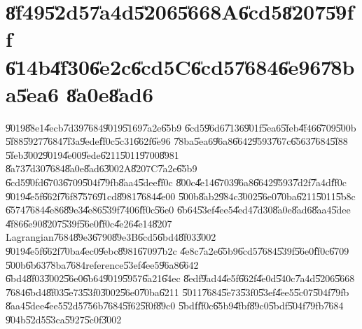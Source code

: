 \documentclass[12pt,a4paper]{article}
\begin{document}
\bigskip

\part{\U{8f49}\U{52d5}\U{7a4d}\U{5206}\U{5668}A\U{6cd5}\U{8207}\U{59ff}%
\U{614b}\U{4f30}\U{6e2c}\U{6cd5}C\U{6cd5}\U{7684}\U{6e96}\U{78ba}\U{5ea6}%
\U{8a0e}\U{8ad6}}

\U{9019}\U{88e1}\U{4ecb}\U{7d39}\U{7684}\U{9019}\U{5169}\U{7a2e}\U{65b9}%
\U{6cd5}\U{96d6}\U{7136}\U{901f}\U{5ea6}\U{5feb}\U{4f46}\U{6709}\U{500b}%
\U{5f88}\U{5927}\U{7684}\U{7f3a}\U{9ede}\U{ff0c}\U{5c31}\U{662f}\U{6e96}%
\U{78ba}\U{5ea6}\U{96a8}\U{6642}\U{9593}\U{767c}\U{6563}\U{7684}\U{5f88}%
\U{5feb}\U{3002}\U{9019}\U{4e00}\U{9ede}\U{6211}\U{5011}\U{9700}\U{8981}%
\U{8a73}\U{7d30}\U{7684}\U{8a0e}\U{8ad6}\U{3002}A\U{8207}C\U{7a2e}\U{65b9}%
\U{6cd5}\U{90fd}\U{6703}\U{6709}\U{504f}\U{79fb}\U{8aa4}\U{5dee}\U{ff0c}%
\U{800c}\U{4e14}\U{6703}\U{96a8}\U{6642}\U{9593}\U{7d2f}\U{7a4d}\U{ff0c}%
\U{9019}\U{4e5f}\U{662f}\U{76f8}\U{7576}\U{91cd}\U{8981}\U{7684}\U{4e00}%
\U{500b}\U{8ab2}\U{984c}\U{3002}\U{56e0}\U{70ba}\U{6211}\U{5011}\U{5b8c}%
\U{6574}\U{7684}\U{4e86}\U{89e3}\U{4e86}\U{539f}\U{7406}\U{ff0c}\U{56e0}%
\U{6b64}\U{53ef}\U{4ee5}\U{4ed4}\U{7d30}\U{8a0e}\U{8ad6}\U{8aa4}\U{5dee}%
\U{4f86}\U{6e90}\U{8207}\U{539f}\U{56e0}\U{ff0c}\U{4e26}\U{4e14}\U{8207}%
Lagrangian\U{7684}\U{89e3}\U{6790}\U{89e3}B\U{6cd5}\U{6bd4}\U{8f03}\U{3002}%
\U{9019}\U{4e5f}\U{662f}\U{70ba}\U{4ec0}\U{9ebc}\U{8981}\U{6709}\U{7b2c}%
\U{4e8c}\U{7a2e}\U{65b9}\U{6cd5}\U{7684}\U{539f}\U{56e0}\U{ff0c}\U{6709}%
\U{500b}\U{6b63}\U{78ba}\U{7684}reference\U{53ef}\U{4ee5}\U{96a8}\U{6642}%
\U{6bd4}\U{8f03}\U{3002}\U{56e0}\U{6b64}\U{9019}\U{5957}\U{6a21}\U{64ec}%
\U{8edf}\U{9ad4}\U{4e5f}\U{662f}\U{4e0d}\U{540c}\U{7a4d}\U{5206}\U{5668}%
\U{7684}\U{6bd4}\U{8f03}\U{5e73}\U{53f0}\U{3002}\U{56e0}\U{70ba}\U{6211}%
\U{5011}\U{7684}\U{5e73}\U{53f0}\U{53ef}\U{4ee5}\U{5c07}\U{504f}\U{79fb}%
\U{8aa4}\U{5dee}\U{4ee5}\U{52d5}\U{756b}\U{7684}\U{5f62}\U{5f0f}\U{89c0}%
\U{5bdf}\U{ff0c}\U{65b9}\U{4fbf}\U{89c0}\U{5bdf}\U{504f}\U{79fb}\U{7684}%
\U{904b}\U{52d5}\U{53ca}\U{5927}\U{5c0f}\U{3002}

\bigskip
\end{document}
